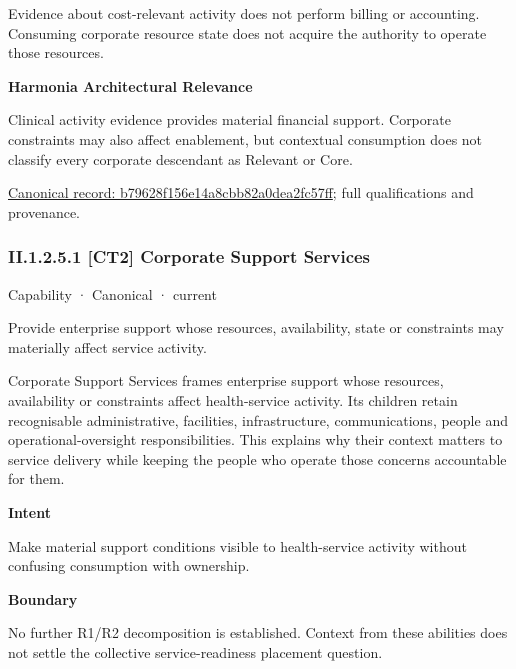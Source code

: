 Evidence about cost-relevant activity does not perform billing or accounting. Consuming corporate resource state does not acquire the authority to operate those resources.



\textbf{Harmonia Architectural Relevance}



Clinical activity evidence provides material financial support. Corporate constraints may also affect enablement, but contextual consumption does not classify every corporate descendant as Relevant or Core.


{\footnotesize \href{../../../../../../../continuum/strategy/capability/b79628f156e14a8cbb82a0dea2fc57ff.md}{Canonical record: b79628f156e14a8cbb82a0dea2fc57ff}; full qualifications and provenance.}\par
\subsubsection*{II.1.2.5.1 [CT2] Corporate Support Services}
\label{navigation:II.1.2.5.1}

\label{element:c8777bccbe304e36b7d9fbd955d67579}
{\small Capability · Canonical · current}\par

Provide enterprise support whose resources, availability, state or constraints may materially affect service activity.



Corporate Support Services frames enterprise support whose resources, availability or constraints affect health-service activity. Its children retain recognisable administrative, facilities, infrastructure, communications, people and operational-oversight responsibilities. This explains why their context matters to service delivery while keeping the people who operate those concerns accountable for them.



\textbf{Intent}



Make material support conditions visible to health-service activity without confusing consumption with ownership.



\textbf{Boundary}



No further R1/R2 decomposition is established. Context from these abilities does not settle the collective service-readiness placement question.


